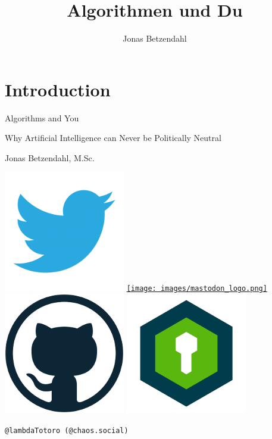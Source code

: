 \documentclass[aspectratio=169,x11names]{beamer}
\author{Jonas Betzendahl}
\title{Algorithmen und Du}
\begin{document}
\section{Introduction}

\begin{frame}
\begin{center}
\vfill
\huge Algorithms and You
\normalsize 
\smallskip
\smallskip

Why Artificial Intelligence can Never be Politically Neutral
\bigskip\bigskip

\large Jonas Betzendahl, M.Sc.
\bigskip\bigskip

\href{https://twitter.com/lambdatotoro}{\includegraphics[scale=0.125]{images/twitter_logo.png}}
\href{https://chaos.social/@lambdatotoro}{\texttt{[image: images/mastodon\_logo.png]}}
\href{https://github.com/lambdaTotoro}{\includegraphics[scale=0.125]{images/github_logo.png}}
\href{https://whispeer.de/en/user/jbetzend}{\includegraphics[scale=0.125]{images/whispeer_logo.png}}

\texttt{@lambdaTotoro (@chaos.social)}
\end{center}
\end{frame}
\end{document}
